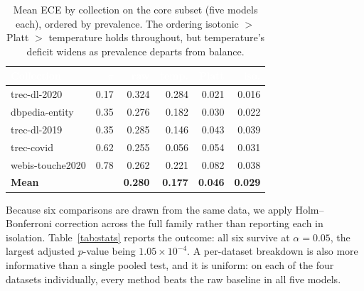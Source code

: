 \documentclass[sn-mathphys-num,pdflatex]{sn-jnl}
\newcommand{\thead}[1]{\textcolor{white}{\textbf{#1}}}
\begin{document}
\begin{table}[t]
\centering
\caption{Mean ECE by collection on the core subset (five models each), ordered by
prevalence. The ordering isotonic $>$ Platt $>$ temperature holds throughout, but
temperature's deficit widens as prevalence departs from balance.}\label{tab:core}
\small
\begin{tabular}{lrrrrr}
\toprule
\rowcolor{headblue}
\thead{Collection} & \thead{$\pi$} & \thead{raw} & \thead{temp.} & \thead{Platt} & \thead{iso.} \\
\midrule
\rowcolor{cleangreen}
trec-dl-2020     & 0.17 & 0.324 & 0.284 & 0.021 & 0.016 \\
\rowcolor{cleangreen}
dbpedia-entity   & 0.35 & 0.276 & 0.182 & 0.030 & 0.022 \\
\rowcolor{cleangreen}
trec-dl-2019     & 0.35 & 0.285 & 0.146 & 0.043 & 0.039 \\
\rowcolor{cleangreen}
trec-covid       & 0.62 & 0.255 & 0.056 & 0.054 & 0.031 \\
\rowcolor{cleangreen}
webis-touche2020 & 0.78 & 0.262 & 0.221 & 0.082 & 0.038 \\
\midrule
\rowcolor{bestcell}
\textbf{Mean}    &      & \textbf{0.280} & \textbf{0.177} & \textbf{0.046} & \textbf{0.029} \\
\bottomrule
\end{tabular}
\end{table}

Because six comparisons are drawn from the same data, we apply Holm--Bonferroni
correction across the full family rather than reporting each in isolation.
Table~\ref{tab:stats} reports the outcome: all six survive at $\alpha = 0.05$, the
largest adjusted $p$-value being $1.05\times10^{-4}$. A per-dataset breakdown is
also more informative than a single pooled test, and it is uniform: on each of the
four datasets individually, every method beats the raw baseline in all five models.
\end{document}
